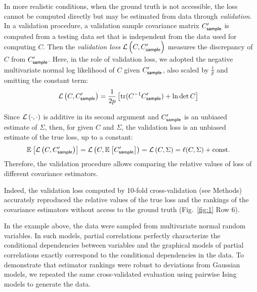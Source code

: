 In more realistic conditions, when the ground truth is not accessible, the loss cannot be computed directly but may be estimated from data through \emph{validation}.
In a validation procedure, a validation sample covariance matrix $C_{\sf sample}^\prime$ is computed from a testing data set that is independent from the data used for computing $C$.
Then the \emph{validation loss} $\mathcal L\left(C,C^\prime_{\sf sample}\right)$ measures the discrepancy of $C$ from $C^\prime_{\sf sample}$. 
Here, in the role of validation loss, we adopted the negative multivariate normal log likelihood of $C$ given $C^\prime_{\sf sample}$, also scaled by $\frac 1 p$ and omitting the constant term: 
\begin{equation}\label{eq:vloss}
    \mathcal L\left(C,C^\prime_{\sf sample}\right) = \frac 1 {2p} \left[\operatorname{tr}(C^{-1}C^\prime_{\sf sample})+\ln\det C \right]
\end{equation}

Since $\mathcal L\left(\cdot,\cdot\right)$ is additive in its second argument and $C^\prime_{\sf sample}$ is an unbiased estimate of $\Sigma$, then, for given $C$ and $\Sigma$, the validation loss is an unbiased estimate of the true loss, up to a constant:
\begin{equation}
    \mathbb E_{}\left[ \mathcal L\left(C,C_{\sf sample}^\prime\right)\right]=\mathcal L\left(C,\mathbb E_{}\left[ C_{\sf sample}^\prime\right]\right)=\mathcal L\left(C,\Sigma\right) = \ell(C,\Sigma) + \mbox{const}.
\end{equation}
Therefore, the validation procedure allows comparing the relative values of loss of different covariance estimators.

Indeed, the validation loss computed by 10-fold cross-validation (see Methods) accurately reproduced the relative values of the true loss and the rankings of the covariance estimators without access to the ground truth (Fig.~\ref{fig:1} Row 6). 

In the example above, the data were sampled from  multivariate normal random variables. In such models, partial correlations perfectly characterize the conditional dependencies between variables and the graphical models of partial correlations exactly correspond to the conditional dependencies in the data. 
To demonstrate that estimator rankings were robust to deviations from Gaussian models, we repeated the same cross-validated evaluation using pairwise Ising models to generate the data.

